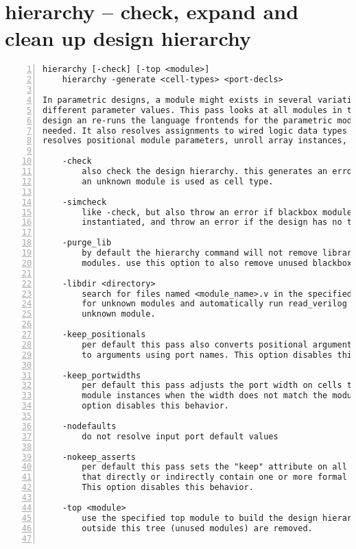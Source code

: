 \section{hierarchy -- check, expand and clean up design hierarchy}
\label{cmd:hierarchy}
\begin{lstlisting}[numbers=left,frame=single]
    hierarchy [-check] [-top <module>]
    hierarchy -generate <cell-types> <port-decls>

In parametric designs, a module might exists in several variations with
different parameter values. This pass looks at all modules in the current
design an re-runs the language frontends for the parametric modules as
needed. It also resolves assignments to wired logic data types (wand/wor),
resolves positional module parameters, unroll array instances, and more.

    -check
        also check the design hierarchy. this generates an error when
        an unknown module is used as cell type.

    -simcheck
        like -check, but also throw an error if blackbox modules are
        instantiated, and throw an error if the design has no top module.

    -purge_lib
        by default the hierarchy command will not remove library (blackbox)
        modules. use this option to also remove unused blackbox modules.

    -libdir <directory>
        search for files named <module_name>.v in the specified directory
        for unknown modules and automatically run read_verilog for each
        unknown module.

    -keep_positionals
        per default this pass also converts positional arguments in cells
        to arguments using port names. This option disables this behavior.

    -keep_portwidths
        per default this pass adjusts the port width on cells that are
        module instances when the width does not match the module port. This
        option disables this behavior.

    -nodefaults
        do not resolve input port default values

    -nokeep_asserts
        per default this pass sets the "keep" attribute on all modules
        that directly or indirectly contain one or more formal properties.
        This option disables this behavior.

    -top <module>
        use the specified top module to build the design hierarchy. Modules
        outside this tree (unused modules) are removed.


\end{lstlisting}
